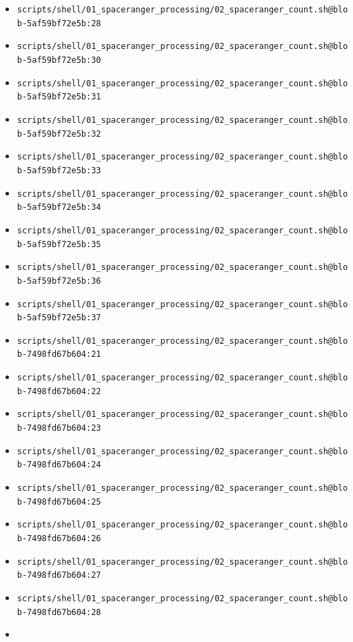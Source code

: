 \documentclass[
]{article}
\begin{document}
\begin{itemize}
  \texttt{scripts/shell/01\_spaceranger\_processing/02\_spaceranger\_count.sh@blob-5af59bf72e5b:27}
\item
  \texttt{scripts/shell/01\_spaceranger\_processing/02\_spaceranger\_count.sh@blob-5af59bf72e5b:28}
\item
  \texttt{scripts/shell/01\_spaceranger\_processing/02\_spaceranger\_count.sh@blob-5af59bf72e5b:30}
\item
  \texttt{scripts/shell/01\_spaceranger\_processing/02\_spaceranger\_count.sh@blob-5af59bf72e5b:31}
\item
  \texttt{scripts/shell/01\_spaceranger\_processing/02\_spaceranger\_count.sh@blob-5af59bf72e5b:32}
\item
  \texttt{scripts/shell/01\_spaceranger\_processing/02\_spaceranger\_count.sh@blob-5af59bf72e5b:33}
\item
  \texttt{scripts/shell/01\_spaceranger\_processing/02\_spaceranger\_count.sh@blob-5af59bf72e5b:34}
\item
  \texttt{scripts/shell/01\_spaceranger\_processing/02\_spaceranger\_count.sh@blob-5af59bf72e5b:35}
\item
  \texttt{scripts/shell/01\_spaceranger\_processing/02\_spaceranger\_count.sh@blob-5af59bf72e5b:36}
\item
  \texttt{scripts/shell/01\_spaceranger\_processing/02\_spaceranger\_count.sh@blob-5af59bf72e5b:37}
\item
  \texttt{scripts/shell/01\_spaceranger\_processing/02\_spaceranger\_count.sh@blob-7498fd67b604:21}
\item
  \texttt{scripts/shell/01\_spaceranger\_processing/02\_spaceranger\_count.sh@blob-7498fd67b604:22}
\item
  \texttt{scripts/shell/01\_spaceranger\_processing/02\_spaceranger\_count.sh@blob-7498fd67b604:23}
\item
  \texttt{scripts/shell/01\_spaceranger\_processing/02\_spaceranger\_count.sh@blob-7498fd67b604:24}
\item
  \texttt{scripts/shell/01\_spaceranger\_processing/02\_spaceranger\_count.sh@blob-7498fd67b604:25}
\item
  \texttt{scripts/shell/01\_spaceranger\_processing/02\_spaceranger\_count.sh@blob-7498fd67b604:26}
\item
  \texttt{scripts/shell/01\_spaceranger\_processing/02\_spaceranger\_count.sh@blob-7498fd67b604:27}
\item
  \texttt{scripts/shell/01\_spaceranger\_processing/02\_spaceranger\_count.sh@blob-7498fd67b604:28}
\item

\end{itemize}
\end{document}
